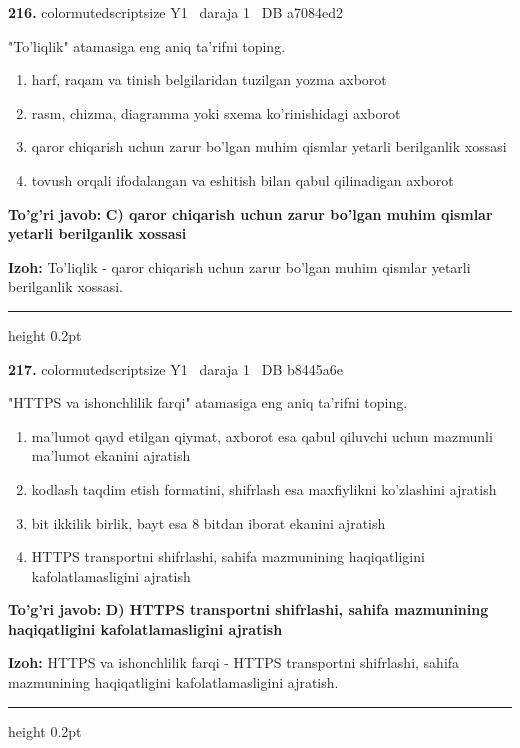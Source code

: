 \documentclass[10pt,a4paper,oneside]{article}
\begin{document}
\noindent\textbf{\color{ink}216.}  {color{muted}scriptsize Y1 \textbullet\ daraja 1 \textbullet\ DB a7084ed2}
\par
"To'liqlik" atamasiga eng aniq ta'rifni toping.
\begin{enumerate}[label=\Alph*),leftmargin=9mm]
\item harf, raqam va tinish belgilaridan tuzilgan yozma axborot
\item rasm, chizma, diagramma yoki sxema ko'rinishidagi axborot
\item qaror chiqarish uchun zarur bo'lgan muhim qismlar yetarli berilganlik xossasi
\item tovush orqali ifodalangan va eshitish bilan qabul qilinadigan axborot
\end{enumerate}
\begin{tcolorbox}[enhanced,breakable,colback=teal!4,colframe=teal!50!black,boxrule=0.5pt,arc=1.1mm,left=3mm,right=3mm,top=1.7mm,bottom=1.7mm,before skip=2mm,after skip=2mm]
\textbf{\color{teal}To'g'ri javob:} \textbf{C) qaror chiqarish uchun zarur bo'lgan muhim qismlar yetarli berilganlik xossasi}
\par\smallskip
\textbf{Izoh:} To'liqlik - qaror chiqarish uchun zarur bo'lgan muhim qismlar yetarli berilganlik xossasi.
\end{tcolorbox}
\vspace{2mm}\hrule height 0.2pt \vspace{3mm}

\noindent\textbf{\color{ink}217.}  {color{muted}scriptsize Y1 \textbullet\ daraja 1 \textbullet\ DB b8445a6e}
\par
"HTTPS va ishonchlilik farqi" atamasiga eng aniq ta'rifni toping.
\begin{enumerate}[label=\Alph*),leftmargin=9mm]
\item ma'lumot qayd etilgan qiymat, axborot esa qabul qiluvchi uchun mazmunli ma'lumot ekanini ajratish
\item kodlash taqdim etish formatini, shifrlash esa maxfiylikni ko'zlashini ajratish
\item bit ikkilik birlik, bayt esa 8 bitdan iborat ekanini ajratish
\item HTTPS transportni shifrlashi, sahifa mazmunining haqiqatligini kafolatlamasligini ajratish
\end{enumerate}
\begin{tcolorbox}[enhanced,breakable,colback=teal!4,colframe=teal!50!black,boxrule=0.5pt,arc=1.1mm,left=3mm,right=3mm,top=1.7mm,bottom=1.7mm,before skip=2mm,after skip=2mm]
\textbf{\color{teal}To'g'ri javob:} \textbf{D) HTTPS transportni shifrlashi, sahifa mazmunining haqiqatligini kafolatlamasligini ajratish}
\par\smallskip
\textbf{Izoh:} HTTPS va ishonchlilik farqi - HTTPS transportni shifrlashi, sahifa mazmunining haqiqatligini kafolatlamasligini ajratish.
\end{tcolorbox}
\vspace{2mm}\hrule height 0.2pt \vspace{3mm}
\end{document}
